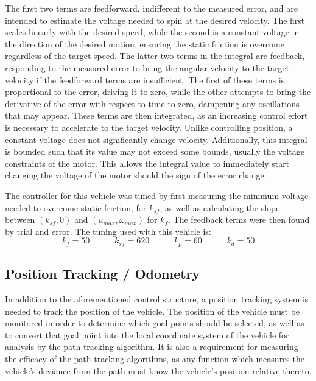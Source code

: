 \documentclass[mla8alt]{mla}
\begin{document}
\begin{paper}
The first two terms are feedforward, indifferent to the measured error, and are intended to estimate the voltage needed to spin at the desired velocity. The first scales linearly with the desired speed, while the second is a constant voltage in the direction of the desired motion, ensuring the static friction is overcome regardless of the target speed. The latter two terms in the integral are feedback, responding to the measured error to bring the angular velocity to the target velocity if the feedforward terms are insufficient. The first of these terms is proportional to the error, driving it to zero, while the other attempts to bring the derivative of the error with respect to time to zero, dampening any oscillations that may appear. These terms are then integrated, as an increasing control effort is necessary to accelerate to the target velocity. Unlike controlling position, a constant voltage does not significantly change velocity. Additionally, this integral is bounded such that its value may not exceed some bounds, usually the voltage constraints of the motor. This allows the integral value to immediately start changing the voltage of the motor should the sign of the error change.

The controller for this vehicle was tuned by first measuring the minimum voltage needed to overcome static friction, for $k_{sf}$, as well as calculating the slope between $(k_{sf}, 0)$ and $(u_{max},\omega_{max})$ for $k_f$. The feedback terms were then found by trial and error. The tuning used with this vehicle is:
\begin{equation}
k_f=50\hspace{35pt}
k_{sf}=620 \hspace{35pt}
k_p=60 \hspace{35pt}
k_d=50
\nonumber
\end{equation}

\subsection{Position Tracking / Odometry}

In addition to the aforementioned control structure, a position tracking system is needed to track the position of the vehicle. The position of the vehicle must be monitored in order to determine which goal points should be selected, as well as to convert that goal point into the local coordinate system of the vehicle for analysis by the path tracking algorithm. It is also a requirement for measuring the efficacy of the path tracking algorithms, as any function which measures the vehicle's deviance from the path must know the vehicle's position relative thereto.


\end{paper}
\end{document}
